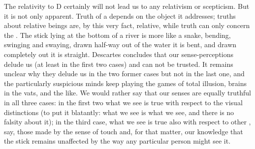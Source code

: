 \pa
The relativity to D certainly will not lead us to any relativism or
scepticism. But it is not only apparent. Truth of a  depends on the
object it addresses; truths about relative beings are, by this very fact,
relative, while  truth can only concern the .
The stick lying at the bottom of a river is more like a snake, bending, swinging
and swaying, drawn half-way out of the water it is bent, and drawn completely
out it is straight.  Descartes concludes that our sense-perceptions delude us
(at least in the first two cases) and can not be trusted. It remains unclear
why they delude us in the two former cases but not in the last one, and the
particularly suspicious minds keep playing the games of total illusion, brains
in the vats, and the like. We would rather say that our senses are equally
truthful in all three cases: in the first two what we see is true with respect to the
visual distinctions (to put it blatantly: what we see is what we see, and there
is no falsity about it); in the third case, what we see is true also with
respect to other , say, those made by 
the sense of touch and, for that matter, our knowledge that the stick remains
unaffected by the way any particular person might see it.

